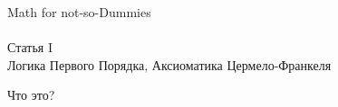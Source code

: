 \documentclass[a4paper]{article}
\begin{document}
\pagestyle{fancyplain}
\begin{center}
	\Huge{Math for not-so-Dummies} \\\
	\\
	\LARGE{
		Статья I\\
		Логика Первого Порядка, Аксиоматика Цермело-Франкеля
	}\\
\end{center}
\pagebreak
{}
\cfoot{-\thepage-}
	\LARGE{Что это?}
	
	
\end{document}
